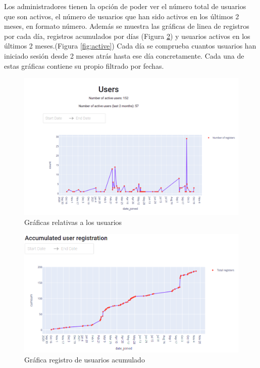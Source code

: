 Los administradores tienen la opción de poder ver el número total de usuarios que son activos, el número de usuarios que han sido activos en los últimos 2 meses, en formato número. Además se muestra las gráficas de linea de registros por cada día, registros acumulados por días (Figura \ref{fig:accumulated}) y usuarios activos en los últimos 2 meses.(Figura \ref{fig:active}) Cada día se comprueba cuantos usuarios han iniciado sesión desde 2 meses atrás hasta ese día concretamente. Cada una de estas gráficas contiene su propio filtrado por fechas. 

\begin{figure}[H]
    \centering
    \includegraphics[width=17cm, keepaspectratio]{img/users.png}
    \caption{Gráficas relativas a los usuarios}
    \label{fig:users}
\end{figure}
\begin{figure}[H]
    \centering
    \includegraphics[width=17cm, keepaspectratio]{img/accumulated.png}
    \caption{Gráfica registro de usuarios acumulado}
    \label{fig:accumulated}
\end{figure}
